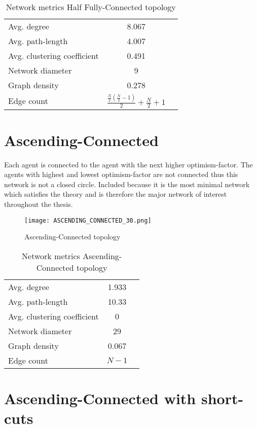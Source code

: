 \documentclass[Bachelorarbeit.tex]{subfiles}
\begin{document}
\begin{table}[h]
	\centering
	\caption{Network metrics Half Fully-Connected topology}
	\begin{tabular} { l c r }
		\hline
		Avg. degree & 8.067 \\
		Avg. path-length & 4.007 \\
		Avg. clustering coefficient & 0.491 \\
		Network diameter & 9 \\
		Graph density & 0.278 \\
		Edge count & $\frac{\frac{N}{2}(\frac{N}{2} - 1)}{2} + \frac{N}{2} + 1$ \\
		\hline
	\end{tabular}
\end{table}

\section{Ascending-Connected}
Each agent is connected to the agent with the next higher optimism-factor. The agents with highest and lowest optimism-factor are not connected thus this network is not a closed circle.
\medskip
Included because it is the most minimal network which satisfies the theory and is therefore the major network of interest throughout the thesis.

\begin{figure}[H]
	\centering
  \texttt{[image: ASCENDING\_CONNECTED\_30.png]}
	\caption{Ascending-Connected topology}
	\label{fig:topology_ASCENDING_CONNECTED_30}
\end{figure}

\begin{table}[h]
	\centering
	\caption{Network metrics Ascending-Connected topology}
	\begin{tabular} { l c r }
		\hline
		Avg. degree & 1.933 \\
		Avg. path-length & 10.33 \\
		Avg. clustering coefficient & 0 \\
		Network diameter & 29 \\
		Graph density & 0.067 \\
		Edge count & $N-1$ \\
		\hline
	\end{tabular}
\end{table}

\section{Ascending-Connected with short-cuts}
\end{document}
